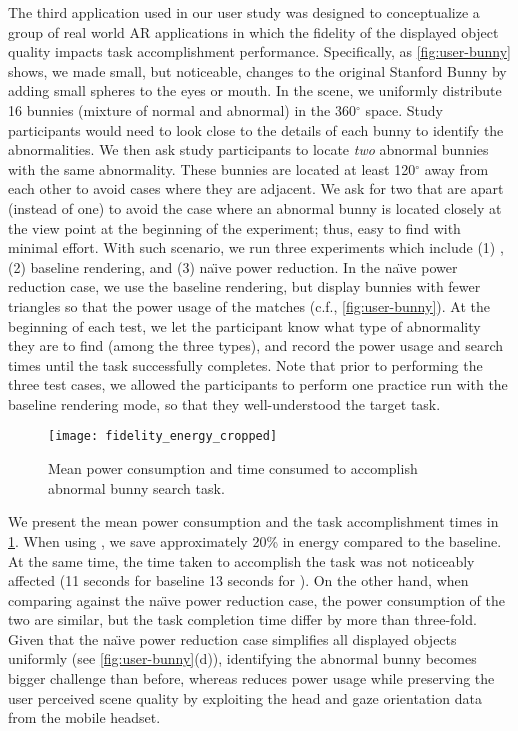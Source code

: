 The third application used in our user study was designed to conceptualize a group
of real world AR applications in which the fidelity of the displayed object quality 
impacts task accomplishment performance.
%
Specifically, as \fig\ref{fig:user-bunny} shows, we made small, but noticeable,
changes to the original Stanford Bunny by adding small spheres to the eyes or mouth.
%
In the scene, we uniformly distribute 16 bunnies (mixture of normal and abnormal) in 
the 360$^\circ$ space.
%
Study participants would need to look close to the details of each bunny to identify the abnormalities. 
%
We then ask study participants to locate \textit{two} abnormal bunnies with the same 
abnormality. These bunnies are located at least 120$^\circ$ away
from each other to avoid cases where they are adjacent. 
%
We ask for two that are apart (instead of one) to avoid the case where 
an abnormal bunny is located closely at the view point at the beginning of the experiment; 
thus, easy to find with minimal effort.
%
With such scenario, we run three experiments which include 
(1) {\myit}, 
(2) baseline rendering, and 
(3)  na\"{\i}ve power reduction.
%
In the na\"{\i}ve power reduction case, we use the baseline rendering, 
but display bunnies with fewer triangles so that the power usage of the {\mlo}
matches {\myit} (c.f., \fig\ref{fig:user-bunny}).
%
At the beginning of each test, we let the participant know what type of
abnormality they are to find (among the three types), and record the power usage 
and search times until the task successfully completes. Note that prior to performing the three test cases, we allowed the participants to perform one practice run with the baseline rendering mode, so that they well-understood the target task. 


\begin{figure}[t]
    \centering
    \vspace{-2ex}
    \texttt{[image: fidelity\_energy\_cropped]}
    \vspace{-3ex}
    \caption{Mean power consumption and time consumed to accomplish 
            abnormal bunny search task.}
    \label{fig:user-fidelity}
\end{figure}


We present the mean power consumption and the task accomplishment
times in \fig\ref{fig:user-fidelity}.
%
When using {\myit}, we save approximately 20\% in energy compared to the 
baseline. At the same time, the time taken to accomplish the task
was not noticeably affected (11 seconds for baseline 13 seconds for {\myit}).
%
On the other hand, when comparing {\myit} against the 
na\"{\i}ve power reduction case, the power consumption of the two are
similar, but the task completion time differ by more than three-fold.
%
Given that the na\"{\i}ve power reduction case simplifies all displayed 
objects uniformly (see \fig\ref{fig:user-bunny}(d)), identifying the abnormal bunny 
becomes bigger challenge than before, whereas {\myit} reduces power usage while preserving the user perceived scene quality by exploiting the head and gaze orientation data from the mobile headset. 



